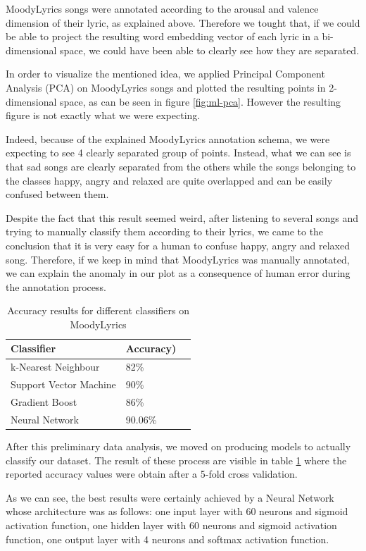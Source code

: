 MoodyLyrics songs were annotated according to the arousal and valence dimension of their lyric,
as explained above. Therefore we tought that, if we could be able to project the resulting
word embedding vector of each lyric in a bi-dimensional space, we could have been able to 
clearly see how they are separated.

In order to visualize the mentioned idea, we applied Principal Component Analysis (PCA) on
MoodyLyrics songs and plotted the resulting points in 2-dimensional space, as can be seen in 
figure \ref{fig:ml-pca}. However the resulting figure is not exactly what we were expecting.

Indeed, because of the explained MoodyLyrics annotation schema, we were expecting to see 4
clearly separated group of points. Instead, what we can see is that sad songs are clearly 
separated from the others while the songs belonging to the classes happy, angry and relaxed
are quite overlapped and can be easily confused between them.

Despite the fact that this result seemed weird, after listening to several songs and trying to
manually classify them according to their lyrics, we came to the conclusion that it is very
easy for a human to confuse happy, angry and relaxed song. Therefore, if we keep in mind that
MoodyLyrics was manually annotated, we can explain the anomaly in our plot as a consequence
of human error during the annotation process.

\begin{table}[]
\centering
\begin{tabular}{@{}lll@{}}
\toprule
\textbf{Classifier} & \textbf{Accuracy})   \\ \midrule
k-Nearest Neighbour & 82\%  \\
Support Vector Machine & 90\%  \\
Gradient Boost & 86\%  \\
Neural Network & 90.06\%  \\
\end{tabular}
\caption{Accuracy results for different classifiers on MoodyLyrics}
\label{table:ml-simple-results}
\end{table}

After this preliminary data analysis, we moved on producing models to actually classify our dataset.
The result of these process are visible in table \ref{table:ml-simple-results} where the reported
accuracy values were obtain after a 5-fold cross validation.

As we can see, the best results were certainly achieved by a Neural Network whose architecture was
as follows: one input layer with 60 neurons and sigmoid activation function, one hidden layer with
60 neurons and sigmoid activation function, one output layer with 4 neurons and softmax activation
function.

